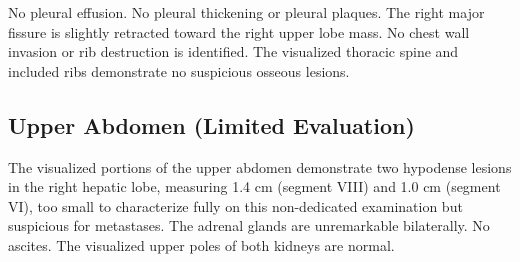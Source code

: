 No pleural effusion. No pleural thickening or pleural plaques. The right major fissure is slightly retracted toward the right upper lobe mass. No chest wall invasion or rib destruction is identified. The visualized thoracic spine and included ribs demonstrate no suspicious osseous lesions.

\subsection{Upper Abdomen (Limited Evaluation)}

The visualized portions of the upper abdomen demonstrate two hypodense lesions in the right hepatic lobe, measuring 1.4 cm (segment VIII) and 1.0 cm (segment VI), too small to characterize fully on this non-dedicated examination but suspicious for metastases. The adrenal glands are unremarkable bilaterally. No ascites. The visualized upper poles of both kidneys are normal.
